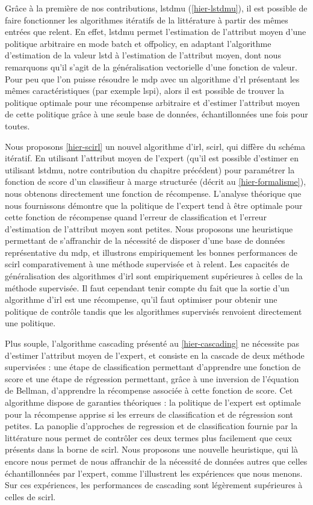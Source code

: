 \documentclass[frenchb,a4paper,justified,notoc]{tufte-book}
\begin{document}
Grâce à la première de nos contributions, \gls{lstdmu} (\autoref{hier-lstdmu}), il est possible de faire fonctionner les algorithmes itératifs de la littérature à partir des mêmes entrées que \gls{relent}. En effet, \gls{lstdmu} permet l'estimation de l'attribut moyen d'une politique arbitraire en mode \gls{batch} et \gls{offpolicy}, en adaptant l'algorithme d'estimation de la valeur \gls{lstd} à l'estimation de l'attribut moyen, dont nous remarquons qu'il s'agit de la généralisation vectorielle d'une fonction de valeur. Pour peu que l'on puisse résoudre le \gls{mdp} avec un algorithme d'\gls{rl} présentant les mêmes caractéristiques (par exemple \gls{lspi}), alors il est possible de trouver la politique optimale pour une récompense arbitraire et d'estimer l'attribut moyen de cette politique grâce à une seule base de données, échantillonnées une fois pour toutes.

Nous proposons \autoref{hier-scirl} un nouvel algorithme d'\gls{irl}, \gls{scirl}, qui diffère du schéma itératif. En utilisant l'attribut moyen de l'expert (qu'il est possible d'estimer en utilisant \gls{lstdmu}, notre contribution du chapitre précédent) pour paramétrer la fonction de score d'un classifieur à marge structurée (décrit au \autoref{hier-formalisme}), nous obtenons directement une fonction de récompense. L'analyse théorique que nous fournissons démontre que la politique de l'expert tend à être optimale pour cette fonction de récompense quand l'erreur de classification et l'erreur d'estimation de l'attribut moyen sont petites. Nous proposons une heuristique permettant de s'affranchir de la nécessité de disposer d'une base de données représentative du \gls{mdp}, et illustrons empiriquement les bonnes performances de \gls{scirl} comparativement à une méthode supervisée et à \gls{relent}. Les capacités de généralisation des algorithmes d'\gls{irl} sont empiriquement supérieures à celles de la méthode supervisée. Il faut cependant tenir compte du fait que la sortie d'un algorithme d'\gls{irl} est une récompense, qu'il faut optimiser pour obtenir une politique de contrôle tandis que les algorithmes supervisés renvoient directement une politique.

Plus souple, l'algorithme \gls{cascading} présenté au \autoref{hier-cascading} ne nécessite pas d'estimer l'attribut moyen de l'expert, et consiste en la cascade de deux méthode supervisées : une étape de classification permettant d'apprendre une fonction de score et une étape de régression permettant, grâce à une inversion de l'équation de Bellman, d'apprendre la récompense associée à cette fonction de score. Cet algorithme dispose de garanties théoriques : la politique de l'expert est optimale pour la récompense apprise si les erreurs de classification et de régression sont petites. La panoplie d'approches de regression et de classification fournie par la littérature nous permet de contrôler ces deux termes plus facilement que ceux présents dans la borne de \gls{scirl}. Nous proposons une nouvelle heuristique, qui là encore nous permet de nous affranchir de la nécessité de données autres que celles échantillonnées par l'expert, comme l'illustrent les expériences que nous menons. Sur ces expériences, les performances de \gls{cascading} sont légèrement supérieures à celles de \gls{scirl}.
\end{document}
